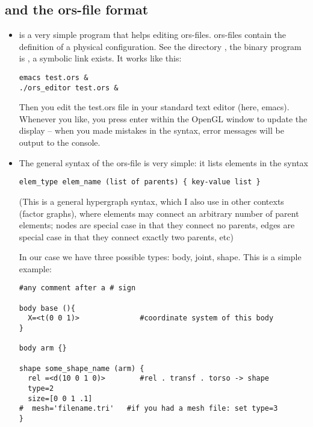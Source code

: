 \subsection{ and the ors-file format}

\begin{itemize}
\item {} is a very simple program that helps editing
   ors-files. ors-files contain the definition of a physical
   configuration. See the directory , the binary
   program is , a symbolic link 
   exists. It works like this:
\begin{code}
\begin{verbatim}
emacs test.ors &
./ors_editor test.ors &
\end{verbatim}
\end{code}

Then you edit the test.ors file in your standard text editor (here,
emacs). Whenever you like, you press enter within the OpenGL window to
update the display -- when you made mistakes in the syntax, error
messages will be output to the console.

\item The general syntax of the ors-file is very simple: it lists elements
in the syntax
\begin{code}
\begin{verbatim}
elem_type elem_name (list of parents) { key-value list }
\end{verbatim}
\end{code}

(This is a general hypergraph syntax, which I also use in other
contexts (factor graphs), where elements may connect an arbitrary
number of parent elements; nodes are special case in that they connect no
parents, edges are special case in that they connect exactly two
parents, etc)

In our case we have three possible types: body, joint, shape. This is
a simple example:
\begin{code}
\begin{verbatim}
#any comment after a # sign

body base (){
  X=<t(0 0 1)>              #coordinate system of this body
}

body arm {}

shape some_shape_name (arm) {
  rel =<d(10 0 1 0)>        #rel . transf . torso -> shape
  type=2
  size=[0 0 1 .1]
#  mesh='filename.tri'   #if you had a mesh file: set type=3
}


\end{verbatim}
\end{code}
\end{itemize}
